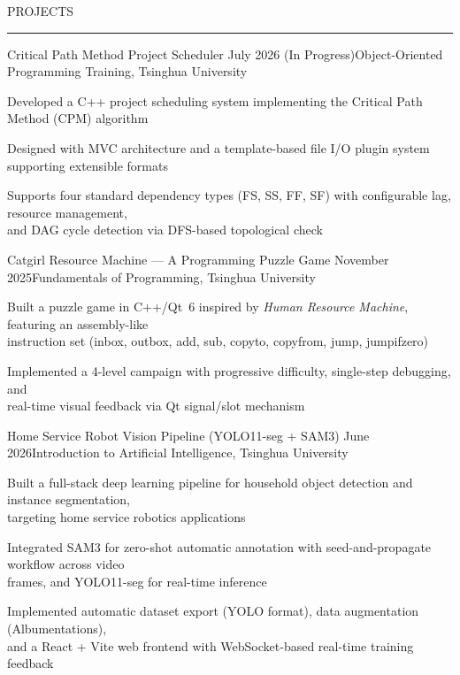 \documentclass{resume} %
\renewenvironment{rSection}[1]{
\sectionskip
\textcolor{TsinghuaPurple}{\MakeUppercase{#1}}
\sectionlineskip
\hrule
\begin{list}{}{
\setlength{\leftmargin}{0em}
}
\item[]
}{
\end{list}
}
\begin{document}
\begin{rSection}{PROJECTS}

\begin{rSubsection}{Critical Path Method Project Scheduler}
{July 2026 (In Progress)}{Object-Oriented Programming Training, Tsinghua University}{}

\item Developed a C++ project scheduling system implementing the Critical Path Method (CPM) algorithm
\item Designed with MVC architecture and a template-based file I/O plugin system supporting extensible formats
\item Supports four standard dependency types (FS, SS, FF, SF) with configurable lag, resource management, \\and DAG cycle detection via DFS-based topological check

\end{rSubsection}


\begin{rSubsection}{Catgirl Resource Machine --- A Programming Puzzle Game}
{November 2025}{Fundamentals of Programming, Tsinghua University}{}

\item Built a puzzle game in C++/Qt~6 inspired by \textit{Human Resource Machine}, featuring an assembly-like \\instruction set (inbox, outbox, add, sub, copyto, copyfrom, jump, jumpifzero)
\item Implemented a 4-level campaign with progressive difficulty, single-step debugging, and \\real-time visual feedback via Qt signal/slot mechanism

\end{rSubsection}


\begin{rSubsection}{Home Service Robot Vision Pipeline (YOLO11-seg + SAM3)}
{June 2026}{Introduction to Artificial Intelligence, Tsinghua University}{}

\item Built a full-stack deep learning pipeline for household object detection and instance segmentation, \\targeting home service robotics applications
\item Integrated SAM3 for zero-shot automatic annotation with seed-and-propagate workflow across video \\frames, and YOLO11-seg for real-time inference
\item Implemented automatic dataset export (YOLO format), data augmentation (Albumentations), \\and a React + Vite web frontend with WebSocket-based real-time training feedback


\end{rSubsection}

\end{rSection} 
\end{document}
